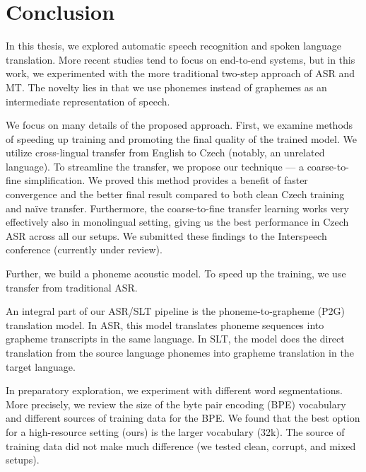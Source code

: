 \chapter*{Conclusion}
\label{chap:conclusion}

In this thesis, we explored automatic speech recognition and spoken language translation. More recent studies tend to focus on end-to-end systems, but in this work, we experimented with the more traditional two-step approach of ASR and MT. The novelty lies in that we use phonemes instead of graphemes as an intermediate representation of speech.

We focus on many details of the proposed approach. First, we examine methods of speeding up training and promoting the final quality of the trained model. We utilize cross-lingual transfer from English to Czech (notably, an unrelated language). To streamline the transfer, we propose our technique --- a coarse-to-fine simplification. We proved this method provides a benefit of faster convergence and the better final result compared to both clean Czech training and na\"ive transfer. Furthermore, the coarse-to-fine transfer learning works very effectively also in monolingual setting, giving us the best performance in Czech ASR across all our setups. We submitted these findings to the Interspeech conference (currently under review).

Further, we build a phoneme acoustic model. To speed up the training, we use transfer from traditional ASR.

An integral part of our ASR/SLT pipeline is the phoneme-to-grapheme (P2G) translation model. In ASR, this model translates phoneme sequences into grapheme transcripts in the same language. In SLT, the model does the direct translation from the source language phonemes into grapheme translation in the target language. 

In preparatory exploration, we experiment with different word segmentations. More precisely, we review the size of the byte pair encoding (BPE) vocabulary and different sources of training data for the BPE. We found that the best option for a high-resource setting (ours) is the larger vocabulary (32k). The source of training data did not make much difference (we tested clean, corrupt, and mixed setups).

